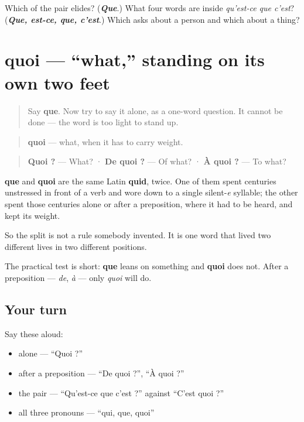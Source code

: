 \begin{tcolorbox}[breakable,colback=teal!4,colframe=teal!35!black,title={Before you move on}]
Which of the pair elides? (\emph{\textbf{Que}}.) What four words are inside \emph{qu'est-ce que c'est}? (\emph{\textbf{Que, est-ce, que, c'est}}.) Which asks about a person and which about a thing?
\end{tcolorbox}
\section[quoi]{quoi — \textquotedblleft{}what,\textquotedblright{} standing on its own two feet}

\label{lesson:FR-C39-quoi}



\begin{quote}
Say \textbf{que}. Now try to say it alone, as a one-word question. It cannot be done — the word is too light to stand up.
\end{quote}

\begin{cousinweb}
\begin{quote}
\textbf{quoi} — what, when it has to carry weight.
\end{quote}

\begin{quote}
\textbf{Quoi ?} — What? · \textbf{De quoi ?} — Of what? · \textbf{À quoi ?} — To what?
\end{quote}

\textbf{que} and \textbf{quoi} are the same Latin \textbf{quid}, twice. One of them spent centuries unstressed in front of a verb and wore down to a single silent-\emph{e} syllable; the other spent those centuries alone or after a preposition, where it had to be heard, and kept its weight.

So the split is not a rule somebody invented. It is one word that lived two different lives in two different positions.

The practical test is short: \textbf{que} leans on something and \textbf{quoi} does not. After a preposition — \emph{de}, \emph{à} — only \emph{quoi} will do.
\end{cousinweb}

\subsection*{Your turn}
Say these aloud:

\begin{itemize}
\raggedright
  \item alone — \textquotedblleft{}Quoi ?\textquotedblright{}
  \item after a preposition — \textquotedblleft{}De quoi ?\textquotedblright{}, \textquotedblleft{}À quoi ?\textquotedblright{}
  \item the pair — \textquotedblleft{}Qu'est-ce que c'est ?\textquotedblright{} against \textquotedblleft{}C'est quoi ?\textquotedblright{}
  \item all three pronouns — \textquotedblleft{}qui, que, quoi\textquotedblright{}
\end{itemize}

